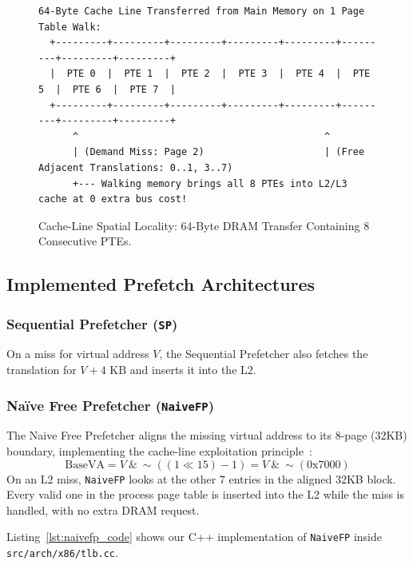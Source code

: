 \begin{figure}[H]
\centering
\begin{lstlisting}[basicstyle=\ttfamily\scriptsize,frame=single]
  64-Byte Cache Line Transferred from Main Memory on 1 Page Table Walk:
  +---------+---------+---------+---------+---------+---------+---------+---------+
  |  PTE 0  |  PTE 1  |  PTE 2  |  PTE 3  |  PTE 4  |  PTE 5  |  PTE 6  |  PTE 7  |
  +---------+---------+---------+---------+---------+---------+---------+---------+
      ^                                           ^
      | (Demand Miss: Page 2)                     | (Free Adjacent Translations: 0..1, 3..7)
      +--- Walking memory brings all 8 PTEs into L2/L3 cache at 0 extra bus cost!
\end{lstlisting}
\caption{Cache-Line Spatial Locality: 64-Byte DRAM Transfer Containing 8 Consecutive PTEs.}
\label{fig:free_pte_diagram}
\end{figure}

\subsection{Implemented Prefetch Architectures}

\subsubsection{Sequential Prefetcher (\texttt{SP})}
On a miss for virtual address $V$, the Sequential Prefetcher also fetches the translation for $V + 4\text{ KB}$ and inserts it into the L2.

\subsubsection{Na\"ive Free Prefetcher (\texttt{NaiveFP})}
The Naive Free Prefetcher aligns the missing virtual address to its 8-page (32KB) boundary, implementing the cache-line exploitation principle~\cite{margaritov2019prefetched}:
\begin{equation}
    \text{BaseVA} = V\ \& \ \sim((1 \ll 15) - 1) = V\ \& \ \sim(0\text{x}7000)
\end{equation}
On an L2 miss, \texttt{NaiveFP} looks at the other 7 entries in the aligned 32KB block. Every valid one in the process page table is inserted into the L2 while the miss is handled, with no extra DRAM request.

Listing~\ref{lst:naivefp_code} shows our C++ implementation of \texttt{NaiveFP} inside \texttt{src/arch/x86/tlb.cc}.

